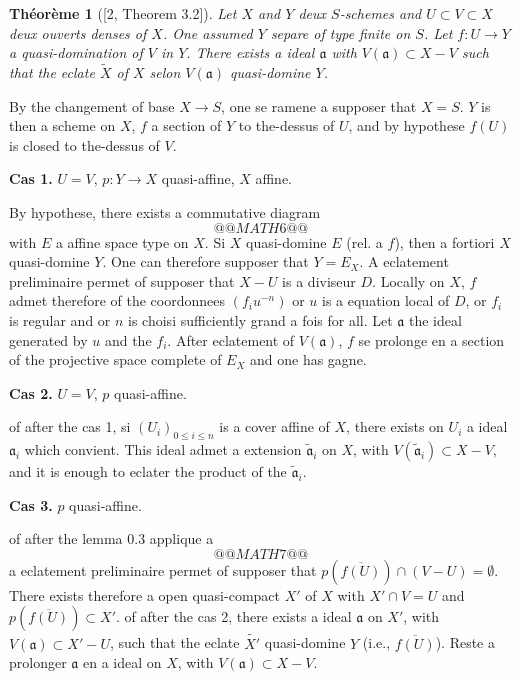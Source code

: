 \documentclass[11pt,a4paper]{article}
\theoremstyle{plain}
\newtheorem{theorem}{Th\'eor\`eme}
\theoremstyle{definition}
\begin{document}
\begin{theorem}[{[2, Theorem 3.2]}]
Let $X$ and $Y$ deux $S$-schemes and $U \subset V \subset X$ deux ouverts denses of $X$. One assumed $Y$ separe of type finite on $S$. Let $f: U \to Y$ a quasi-domination of $V$ in $Y$. There exists a ideal $\mathfrak{a}$ with $V(\mathfrak{a}) \subset X - V$ such that the eclate $\widetilde{X}$ of $X$ selon $V(\mathfrak{a})$ quasi-domine $Y$.
\end{theorem}

By the changement of base $X \to S$, one se ramene a supposer that $X = S$. $Y$ is then a scheme on $X$, $f$ a section of $Y$ to the-dessus of $U$, and by hypothese $f(U)$ is closed to the-dessus of $V$.

\smallskip
\noindent\textbf{Cas 1.} $U = V$, $p: Y \to X$ quasi-affine, $X$ affine.

By hypothese, there exists a commutative diagram
\[
@@MATH6@@
\]
with $E$ a affine space type on $X$. Si $X$ quasi-domine $E$ (rel. a $f$), then a fortiori $X$ quasi-domine $Y$. One can therefore supposer that $Y = E_X$. A eclatement preliminaire permet of supposer that $X - U$ is a diviseur $D$. Locally on $X$, $f$ admet therefore of the coordonnees $(f_i u^{-n})$ or $u$ is a equation local of $D$, or $f_i$ is regular and or $n$ is choisi sufficiently grand a fois for all. Let $\mathfrak{a}$ the ideal generated by $u$ and the $f_i$. After eclatement of $V(\mathfrak{a})$, $f$ se prolonge en a section of the projective space complete of $E_X$ and one has gagne.

\smallskip
\noindent\textbf{Cas 2.} $U = V$, $p$ quasi-affine.

of after the cas 1, si $(U_i)_{0 \leq i \leq n}$ is a cover affine of $X$, there exists on $U_i$ a ideal $\mathfrak{a}_i$ which convient. This ideal admet a extension $\widetilde{\mathfrak{a}}_i$ on $X$, with $V(\widetilde{\mathfrak{a}}_i) \subset X - V$, and it is enough to eclater the product of the $\widetilde{\mathfrak{a}}_i$.

\smallskip
\noindent\textbf{Cas 3.} $p$ quasi-affine.

of after the lemma 0.3 applique a
\[
@@MATH7@@
\]
a eclatement preliminaire permet of supposer that $p(\overline{f(U)}) \cap (V - U) = \emptyset$. There exists therefore a open quasi-compact $X'$ of $X$ with $X' \cap V = U$ and $p(\overline{f(U)}) \subset X'$. of after the cas 2, there exists a ideal $\mathfrak{a}$ on $X'$, with $V(\mathfrak{a}) \subset X' - U$, such that the eclate $\widetilde{X'}$ quasi-domine $Y$ (i.e., $\overline{f(U)}$). Reste a prolonger $\mathfrak{a}$ en a ideal on $X$, with $V(\mathfrak{a}) \subset X - V$.
\end{document}
